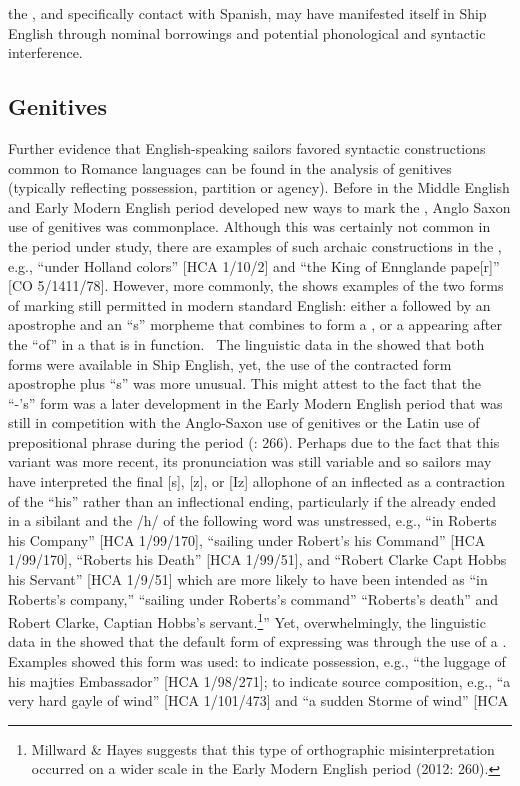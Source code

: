 the , and specifically contact with Spanish, may have manifested itself in Ship English through nominal borrowings and potential phonological and syntactic interference. ~

\subsection{{Genitives}}%

Further evidence that English-speaking sailors favored syntactic constructions common to Romance languages can be found in the analysis of genitives (typically reflecting possession, partition or agency). Before  in the Middle English and Early Modern English period developed new ways to mark the , Anglo Saxon use of  genitives was commonplace. Although this was certainly not common in the period under study, there are examples of such archaic constructions in the , e.g., “under Holland colors” [HCA 1/10/2] and “the King of Ennglande pape[r]” [CO 5/1411/78]. However, more commonly, the  shows examples of the two forms of  marking still permitted in modern standard English: either a  followed by an apostrophe and an “s” morpheme that combines to form a  , or a  appearing after the  “of” in a  that is  in function. ~The linguistic data in the  showed that both forms were available in Ship English, yet, the use of the contracted form apostrophe plus “s” was more unusual. This might attest to the fact that the “-’s”  form was a later development in the Early Modern English period that was still in competition with the Anglo-Saxon use of  genitives or the Latin use of prepositional  phrase during the period (\citealt{Milward1996}: 266). Perhaps due to the fact that this variant was more recent, its pronunciation was still variable and so sailors may have interpreted the final [s], [z], or [Iz] allophone of an inflected   as a contraction of the   “his” rather than an inflectional ending, particularly if the  already ended in a sibilant and the /h/ of the following word was unstressed, e.g., “in Roberts his Company” [HCA 1/99/170], “sailing under Robert’s his Command” [HCA 1/99/170], “Roberts his Death” [HCA 1/99/51], and “Robert Clarke Capt Hobbs his Servant” [HCA 1/9/51] which are more likely to have been intended as “in Roberts’s company,” “sailing under Roberts’s command” “Roberts’s death” and Robert Clarke, Captian Hobbs’s servant.\footnote{Millward \& Hayes suggests that this type of orthographic misinterpretation occurred on a wider scale in the Early Modern English period (2012: 260).}” Yet, overwhelmingly, the linguistic data in the  showed that the default form of expressing  was through the use of a . Examples showed this form was used: to indicate possession, e.g., “the luggage of his majties Embassador” [HCA 1/98/271]; to indicate source composition, e.g., “a very hard gayle of wind” [HCA 1/101/473] and “a sudden Storme of wind” [HCA 